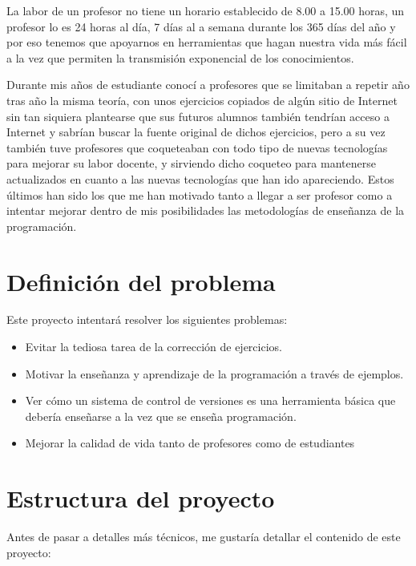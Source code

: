 \bigskip
La labor de un profesor no tiene un horario establecido de 8.00 a 15.00 horas, un profesor lo es 24 horas al día, 7 días al a semana durante los 365 días del año y por eso tenemos que apoyarnos en herramientas que hagan nuestra vida más fácil a la vez que permiten la transmisión exponencial de los conocimientos.

\bigskip
Durante mis años de estudiante conocí a profesores que se limitaban a repetir año tras año la misma teoría, con unos ejercicios copiados de algún sitio de Internet sin tan siquiera plantearse que sus futuros alumnos también tendrían acceso a Internet y sabrían buscar la fuente original de dichos ejercicios, pero a su vez también tuve profesores que coqueteaban con todo tipo de nuevas tecnologías para mejorar su labor docente, y sirviendo dicho coqueteo para mantenerse actualizados en cuanto a las nuevas tecnologías que han ido apareciendo. Estos últimos han sido los que me han motivado tanto a llegar a ser profesor como a intentar mejorar dentro de mis posibilidades las metodologías de enseñanza de la programación.


\section{Definición del problema}

Este proyecto intentará resolver los siguientes problemas:

\begin{itemize}
  \item Evitar la tediosa tarea de la corrección de ejercicios.
  \item Motivar la enseñanza y aprendizaje de la programación a través de ejemplos.
  \item Ver cómo un sistema de control de versiones es una herramienta básica que debería enseñarse a la vez que se enseña programación.
  \item Mejorar la calidad de vida tanto de profesores como de estudiantes
\end{itemize}

\section{Estructura del proyecto}


\bigskip
Antes de pasar a detalles más técnicos, me gustaría detallar el contenido de este proyecto:

